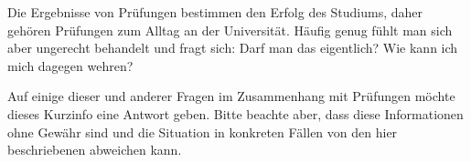 \begin{artikel}{}
Die Ergebnisse von Prüfungen bestimmen den Erfolg des Studiums, daher gehören Prüfungen zum Alltag an der Universität. Häufig genug fühlt man sich aber ungerecht behandelt und fragt sich: Darf man das eigentlich? Wie kann ich mich dagegen wehren?

Auf einige dieser und anderer Fragen im Zusammenhang mit Prüfungen möchte dieses Kurzinfo eine Antwort geben. Bitte beachte aber, dass diese Informationen ohne Gewähr sind und die Situation in konkreten Fällen von den hier beschriebenen abweichen kann.
\end{artikel}
